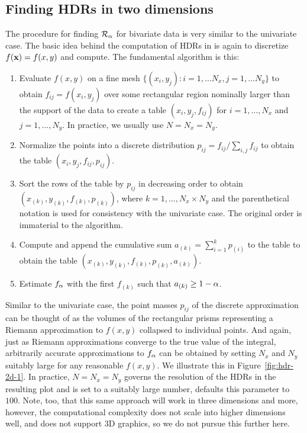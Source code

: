 \pagebreak

\subsection{Finding HDRs in two dimensions}\label{sec:hdr2d}

The procedure for finding $\mathcal{R}_{\alpha}$ for bivariate data is very similar to the univariate case.
The basic idea behind the computation of HDRs in  is again to discretize $f(\textbf{x}) = f(x,y)$ and compute. The fundamental algorithm is this:
\begin{enumerate}
\item Evaluate $f(x,y)$ on a fine mesh $\{(x_{i},y_{j}): i = 1, \ldots N_{x}, j = 1, \ldots N_{y}\}$ to obtain $f_{ij} = f(x_{i},y_{j})$ over some rectangular region nominally larger than the support of the data to create a table $(x_{i}, y_{j}, f_{ij})$ for $i = 1, \ldots, N_{x}$ and $j = 1, \ldots, N_{y}$. In practice, we usually use $N = N_{x} = N_{y}$.
\item Normalize the points into a discrete distribution $p_{ij} = f_{ij} / \sum_{i,j}f_{ij}$ to obtain the table $(x_{i}, y_{j}, f_{ij}, p_{ij})$.
\item Sort the rows of the table by $p_{ij}$ in decreasing order to obtain $(x_{(k)}, y_{(k)}, f_{(k)}, p_{(k)})$, where $k =1, \ldots, N_{x} \times N_{y}$ and the parenthetical notation is used for consistency with the univariate case. The original order is immaterial to the algorithm.
\item Compute and append the cumulative sum $a_{(k)} = \sum_{i=1}^{k}p_{(i)}$ to the table to obtain the table $(x_{(k)}, y_{(k)}, f_{(k)}, p_{(k)}, a_{(k)})$.
\item Estimate $f_{\alpha}$ with the first $f_{(k)}$ such that $a_{(k)} \geq 1 - \alpha$.
\end{enumerate}
Similar to the univariate case, the point masses $p_{ij}$ of the discrete approximation can be thought of as the volumes of the rectangular prisms representing a Riemann approximation to $f(x,y)$ collapsed to individual points. And again, just as Riemann approximations converge to the true value of the integral, arbitrarily accurate approximations to $f_{\alpha}$ can be obtained by setting $N_{x}$ and $N_{y}$ suitably large for any reasonable $f(x,y)$. We illustrate this in Figure~\ref{fig:hdr-2d-1}. In practice, $N = N_{x} = N_{y}$ governs the resolution of the HDRs in the resulting plot and is set to a suitably large number,  defaults this parameter to $100$. Note, too, that this same approach will work in three dimensions and more, however, the computational complexity does not scale into higher dimensions well, and  does not support 3D graphics, so we do not pursue this further here.

